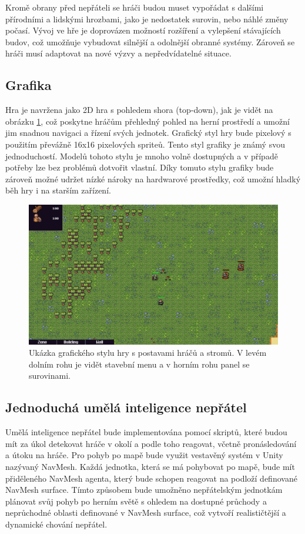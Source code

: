 Kromě obrany před nepřáteli se hráči budou muset vypořádat s dalšími přírodními a lidskými hrozbami, jako je nedostatek surovin, nebo náhlé změny počasí. Vývoj ve hře je doprovázen možností rozšíření a vylepšení stávajících budov, což umožňuje vybudovat silnější a odolnější obranné systémy. Zároveň se hráči musí adaptovat na nové výzvy a nepředvídatelné situace.
\newpage 

\subsection{Grafika}
Hra je navržena jako 2D hra s pohledem shora (top-down), jak je vidět na obrázku \ref{GraphicStyle}, což poskytne hráčům přehledný pohled na herní prostředí a umožní jim snadnou navigaci a řízení svých jednotek. Grafický styl hry bude pixelový s použitím převážně 16x16 pixelových spriteů. Tento styl grafiky je známý svou jednoduchostí. Modelů tohoto stylu je mnoho volně dostupných a v případě potřeby lze bez problémů dotvořit vlastní. Díky tomuto stylu grafiky bude zároveň možné udržet nízké nároky na hardwarové prostředky, což umožní hladký běh hry i na starším zařízení.

\begin{figure}[H]
	\centering
	\includegraphics[scale=0.55]{obrazky-figures/GraphicStyle.png}
	\caption{Ukázka grafického stylu hry s postavami hráčů a stromů. V levém dolním rohu je vidět stavební menu a v horním rohu panel se surovinami.}
	\label{GraphicStyle}
\end{figure}

\subsection{Jednoduchá umělá inteligence nepřátel}
Umělá inteligence nepřátel bude implementována pomocí skriptů, které budou mít za úkol detekovat hráče v okolí a podle toho reagovat, včetně pronásledování a útoku na hráče. Pro pohyb po mapě bude využit vestavěný systém v Unity nazývaný NavMesh. Každá jednotka, která se má pohybovat po mapě, bude mít přiděleného NavMesh agenta, který bude schopen reagovat na podloží definované NavMesh surface. Tímto způsobem bude umožněno nepřátelským jednotkám plánovat svůj pohyb po herním světě s ohledem na dostupné průchody a neprůchodné oblasti definované v NavMesh surface, což vytvoří realističtější a dynamické chování nepřátel.

